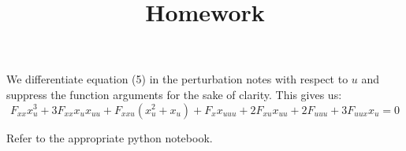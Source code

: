 \documentclass[12pt]{article}
\title{Homework}
\newenvironment{problem}[2][Problem]{\begin{trivlist}
\item[\hskip \labelsep {\bfseries #1}\hskip \labelsep {\bfseries #2}]}{\end{trivlist}}
\begin{document}
\begin{problem}{1.} 
We differentiate equation (5) in the perturbation notes with respect to $u$ and suppress the function arguments for the sake of clarity. This gives us: 
$$F_{xx}x_u^3 + 3 F_{xx}x_ux_{uu} + F_{xxu}(x_u^2 + x_u) + F_xx_{uuu} + 2F_{xu}x_{uu} + 2 F_{uuu} + 3 F_{uux}x_u = 0$$
\end{problem}

\begin{problem}{2-5.} 
Refer to the appropriate python notebook.
\end{problem}
\end{document}
